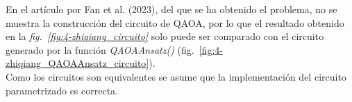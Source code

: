 En el artículo por Fan et al. (2023)\cite{solving_shortest_path_with_qaoa}, del que se ha obtenido el problema, no se muestra la construcción del circuito de QAOA, por lo que el resultado obtenido en la \textit{fig.~\ref{fig:4-zhiqiang_circuito}} solo puede ser comparado con el circuito generado por la función \textit{QAOAAnsatz()} (fig.~\ref{fig:4-zhiqiang_QAOAAnsatz_circuito}).
\\
Como los circuitos son equivalentes se asume que la implementación del circuito parametrizado es correcta.


